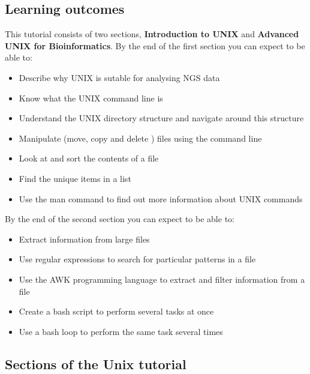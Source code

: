 \documentclass[11pt]{article}
\providecommand{\tightlist}{%
      \setlength{\itemsep}{0pt}\setlength{\parskip}{0pt}}
\begin{document}
\hypertarget{learning-outcomes}{%
\subsection{Learning outcomes}\label{learning-outcomes}}

This tutorial consists of two sections, \textbf{Introduction to UNIX}
and \textbf{Advanced UNIX for Bioinformatics}. By the end of the first
section you can expect to be able to:

\begin{itemize}
\tightlist
\item
  Describe why UNIX is sutable for analysing NGS data
\item
  Know what the UNIX command line is
\item
  Understand the UNIX directory structure and navigate around this
  structure
\item
  Manipulate (move, copy and delete ) files using the command line
\item
  Look at and sort the contents of a file
\item
  Find the unique items in a list
\item
  Use the man command to find out more information about UNIX commands
\end{itemize}



\newpage



By the end of the second section you can expect to be able to:

\begin{itemize}
\tightlist
\item
  Extract information from large files
\item
  Use regular expressions to search for particular patterns in a file
\item
  Use the AWK programming language to extract and filter information
  from a file
\item
  Create a bash script to perform several tasks at once
\item
  Use a bash loop to perform the same task several times
\end{itemize}

\hypertarget{sections-of-the-unix-tutorial}{%
\subsection{Sections of the Unix
tutorial}\label{sections-of-the-unix-tutorial}}
\end{document}

